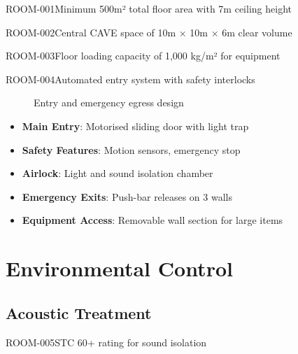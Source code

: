 \begin{requirement}{ROOM-001}{Minimum 500m² total floor area with 7m ceiling height}
\begin{requirement}{ROOM-002}{Central CAVE space of 10m × 10m × 6m clear volume}
\begin{requirement}{ROOM-003}{Floor loading capacity of 1,000 kg/m² for equipment}
\begin{requirement}{ROOM-004}{Automated entry system with safety interlocks}

\begin{figure}[H]
\centering
{}
\caption{Entry and emergency egress design}
\end{figure}

\begin{itemize}
    \item \textbf{Main Entry}: Motorised sliding door with light trap
    \item \textbf{Safety Features}: Motion sensors, emergency stop
    \item \textbf{Airlock}: Light and sound isolation chamber
    \item \textbf{Emergency Exits}: Push-bar releases on 3 walls
    \item \textbf{Equipment Access}: Removable wall section for large items
\end{itemize}

\section{Environmental Control}

\subsection{Acoustic Treatment}

\begin{requirement}{ROOM-005}{STC 60+ rating for sound isolation}


\end{requirement}
\end{requirement}
\end{requirement}
\end{requirement}
\end{requirement}
